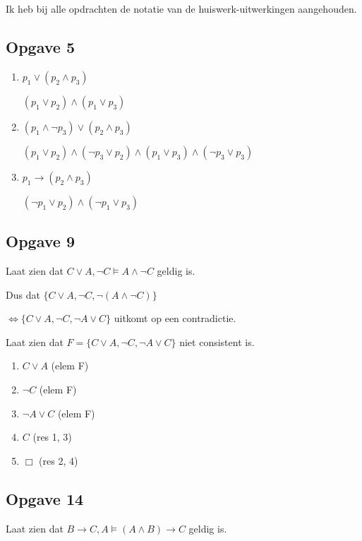 \documentclass[11pt]{article}
\begin{document}
%

Ik heb bij alle opdrachten de notatie van de huiswerk-uitwerkingen aangehouden.

\subsection*{Opgave 5}
\begin{enumerate}[label=\alph*]
  \item $p_1 \vee (p_2 \wedge p_3)$

  $(p_1 \vee p_2) \wedge (p_1 \vee p_3)$

  \item $(p_1 \wedge \neg p_3) \vee (p_2 \wedge p_3)$

  $(p_1 \vee p_2) \wedge (\neg p_3 \vee p_2) \wedge
  (p_1 \vee p_3) \wedge (\neg p_3 \vee p_3)$

  \item $p_1 \rightarrow (p_2 \wedge p_3)$

  $(\neg p_1 \vee p_2) \wedge (\neg p_1 \vee p_3)$

\end{enumerate}


\subsection*{Opgave 9}
Laat zien dat $C \vee A, \neg C \models A \wedge \neg C$ geldig is.

Dus dat $\{C\vee A,\neg C,\neg(A\wedge\neg C)\}$

$\Leftrightarrow \{C \vee A, \neg C, \neg A \vee C \}$
uitkomt op een contradictie.

Laat zien dat $F = \{C \vee A, \neg C, \neg A \vee C \}$ niet consistent is.

\begin{enumerate}
  \item $C \vee A$ (elem F)
  \item $\neg C$ (elem F)
  \item $\neg A \vee C$ (elem F)
  \item $C$ (res 1, 3)
  \item $\Box$ (res 2, 4)
\end{enumerate}


\subsection*{Opgave 14}
Laat zien dat $B \rightarrow C, A \models (A \wedge B) \rightarrow C$ geldig is.
\end{document}
